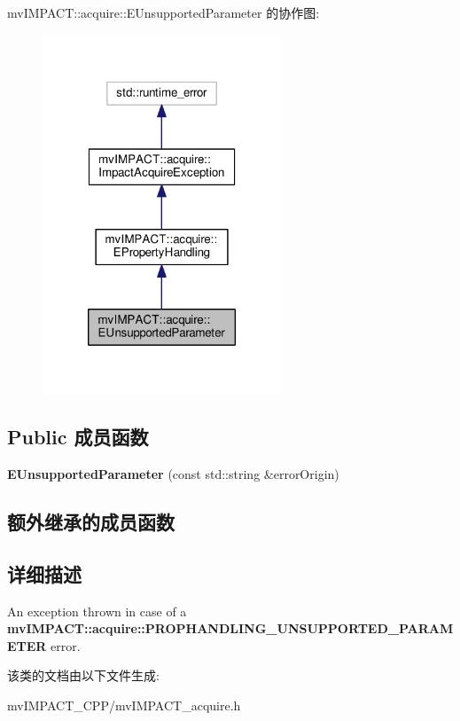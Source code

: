 mv\+I\+M\+P\+A\+C\+T\+:\+:acquire\+:\+:E\+Unsupported\+Parameter 的协作图\+:
\nopagebreak
\begin{figure}[H]
\begin{center}
\leavevmode
\includegraphics[width=202pt]{classmv_i_m_p_a_c_t_1_1acquire_1_1_e_unsupported_parameter__coll__graph}
\end{center}
\end{figure}
\subsection*{Public 成员函数}
\begin{DoxyCompactItemize}
\item 
\hypertarget{classmv_i_m_p_a_c_t_1_1acquire_1_1_e_unsupported_parameter_a493dd30ee77583dae0d22852911b95c1}{{\bfseries E\+Unsupported\+Parameter} (const std\+::string \&error\+Origin)}\label{classmv_i_m_p_a_c_t_1_1acquire_1_1_e_unsupported_parameter_a493dd30ee77583dae0d22852911b95c1}

\end{DoxyCompactItemize}
\subsection*{额外继承的成员函数}


\subsection{详细描述}
An exception thrown in case of a {\bfseries mv\+I\+M\+P\+A\+C\+T\+::acquire\+::\+P\+R\+O\+P\+H\+A\+N\+D\+L\+I\+N\+G\+\_\+\+U\+N\+S\+U\+P\+P\+O\+R\+T\+E\+D\+\_\+\+P\+A\+R\+A\+M\+E\+T\+E\+R} error. 

该类的文档由以下文件生成\+:\begin{DoxyCompactItemize}
\item 
mv\+I\+M\+P\+A\+C\+T\+\_\+\+C\+P\+P/mv\+I\+M\+P\+A\+C\+T\+\_\+acquire.\+h\end{DoxyCompactItemize}
